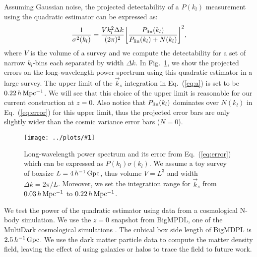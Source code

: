 \documentclass[prd,amsmath,amssymb,floatfix,superscriptaddress,nofootinbib,twocolumn]{revtex4-1}
\def\be{\begin{equation}}
\def\ee{\end{equation}}
\newcommand{\vk}{\vec{k}}
\newcommand{\ec}[1]{Eq.~(\ref{eq:#1})}
\newcommand{\eql}[1]{\label{eq:#1}}
\newcommand{\rf}[1]{\ref{fig:#1}}
\newcommand{\sfig}[2]{
\texttt{[image: ../plots/\#1]}
        }
\newcommand{\Sfig}[2]{
   \begin{figure}[thbp]
   \begin{center}
    \sfig{../plots/#1.pdf}{\columnwidth}
    \caption{{\small #2}}
    \label{fig:#1}
     \end{center}
   \end{figure}
}
\newcommand{\peikai}[1]{{\color{blue} #1}}
\newcommand{\RC}[1]{{\color{darkorange} #1}}
\begin{document}
Assuming Gaussian noise, the projected detectability of a $P(k_l)$ measurement using the quadratic estimator can be expressed as:
\be
\frac{1}{\sigma^{2}(k_l)}=\frac{V k_l^2 \Delta k }{(2\pi)^2}\bigg[\frac{P_{\rm lin}(k_l)}{P_{\rm lin}(k_l)+N(k_l) }\bigg]^2 \eql{error},
\ee
where $V$ is the volume of a survey and we compute the detectability for a set of narrow $k_l$-bins each separated by width $\Delta k$.
In Fig.~\rf{SN}, we show the projected errors on the long-wavelength power spectrum using this quadratic estimator in a large survey. The upper limit of the $\vk_s$ integration in \ec{a} is set to be $0.22\,h\,\rm Mpc^{-1}$. We will see that this choice of the upper limit is reasonable for our current construction at $z=0$. Also notice that $P_{\rm lin}(k_l)$ dominates over $N(k_l)$ in \ec{error} for this upper limit, thus the projected error bars are only slightly wider than the cosmic variance error bars ($N=0$).

\Sfig{SN}{Long-wavelength power spectrum and its error from \ec{error} which can be expressed as $P(k_l)\sigma(k_l)$. We assume a toy survey of boxsize $L=4\, h^{-1}\rm\, Gpc$, thus volume $V=L^3$ and width $\Delta k = 2\pi/L$. Moreover, we set the integration range for $\vk_s$ from $0.03 \,h \,\rm Mpc^{-1}$ to $0.22\,h\,\rm Mpc^{-1}$.}


\label{sec3}
We test the power of the quadratic estimator using data from a cosmological N-body simulation. We use the $z=0$ snapshot from BigMPDL, one of the MultiDark cosmological simulations \cite{Klypin:2014nov}. The cubical box side length of BigMDPL is $2.5\,h^{-1}\,\rm Gpc$. We use the dark matter particle data to compute the matter density field, leaving the effect of using galaxies or halos to trace the field \cite{Desjacques:2018rev} to  future work.
\end{document}
